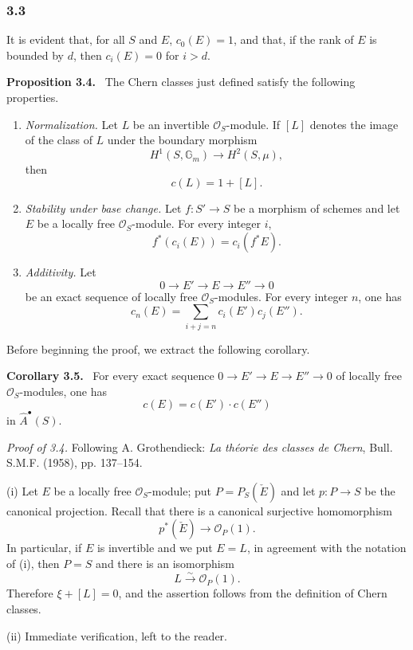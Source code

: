 \documentclass[11pt]{article}
\newenvironment{statement}[1]{\par\medskip\noindent\textbf{#1.}\ }{\par\medskip}
\begin{document}
\subsubsection*{3.3}
It is evident that, for all $S$ and $E$, $c_0(E)=1$, and that, if the rank of $E$ is bounded by $d$, then $c_i(E)=0$ for $i>d$.

\begin{statement}{Proposition 3.4}
The Chern classes just defined satisfy the following properties.
\begin{enumerate}[label=(\roman*)]
\item \emph{Normalization.} Let $L$ be an invertible $\mathcal O_S$-module. If $[L]$ denotes the image of the class of $L$ under the boundary morphism
\[
H^1(S,\mathbb G_m)\longrightarrow H^2(S,\mu),
\]
then
\[
c(L)=1+[L].
\]
\item \emph{Stability under base change.} Let $f:S'\to S$ be a morphism of schemes and let $E$ be a locally free $\mathcal O_S$-module. For every integer $i$,
\[
f^*(c_i(E))=c_i(f^*E).
\]
\item \emph{Additivity.} Let
\[
0\to E'\to E\to E''\to0
\]
be an exact sequence of locally free $\mathcal O_S$-modules. For every integer $n$, one has
\[
c_n(E)=\sum_{i+j=n}c_i(E')c_j(E'').
\]
\end{enumerate}
\end{statement}

Before beginning the proof, we extract the following corollary.

\begin{statement}{Corollary 3.5}
For every exact sequence $0\to E'\to E\to E''\to0$ of locally free $\mathcal O_S$-modules, one has
\[
c(E)=c(E')\cdot c(E'')
\]
in $\widehat A^{\bullet}(S)$.
\end{statement}

\emph{Proof of 3.4.} Following A. Grothendieck: \emph{La théorie des classes de Chern}, Bull. S.M.F. (1958), pp. 137--154.

(i) Let $E$ be a locally free $\mathcal O_S$-module; put $P=P_S(\check E)$ and let $p:P\to S$ be the canonical projection. Recall that there is a canonical surjective homomorphism
\[
p^*(\check E)\longrightarrow \mathcal O_P(1).
\]
In particular, if $E$ is invertible and we put $E=L$, in agreement with the notation of (i), then $P=S$ and there is an isomorphism
\[
L\xrightarrow{\sim}\mathcal O_P(1).
\]
Therefore $\xi+[L]=0$, and the assertion follows from the definition of Chern classes.

(ii) Immediate verification, left to the reader.
\end{document}
